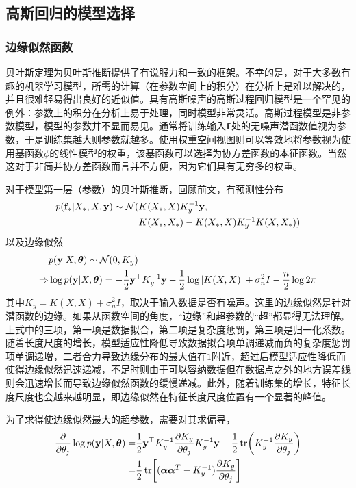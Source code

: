 \documentclass[12pt,UTF8]{article}
\begin{document}
        \subsection{高斯回归的模型选择}
            \subsubsection{边缘似然函数}
                贝叶斯定理为贝叶斯推断提供了有说服力和一致的框架。不幸的是，对于大多数有趣的机器学习模型，所需的计算（在参数空间上的积分）在分析上是难以解决的，并且很难轻易得出良好的近似值。具有高斯噪声的高斯过程回归模型是一个罕见的例外：参数上的积分在分析上易于处理，同时模型非常灵活。高斯过程模型是非参数模型，模型的参数并不显而易见。通常将训练输入$\vb{f}$处的无噪声潜函数值视为参数，于是训练集越大则参数就越多。使用权重空间视图则可以等效地将参数视为使用基函数$\phi$的线性模型的权重，该基函数可以选择为协方差函数的本征函数。当然这对于非简并协方差函数而言并不方便，因为它们具有无穷多的权重。\par
                对于模型第一层（参数）的贝叶斯推断，回顾前文，有预测性分布
                \begin{align}
                    p(\vb{f}_*|X_*,X,\vb{y})\sim\mathcal{N}(&K(X_*,X)K_y^{-1}\vb{y},\nonumber \\
                    &K(X_*,X_*)-K(X_*,X)K_y^{-1}K(X,X_*))
                \end{align}
                以及边缘似然
                \begin{align}
                    &p(\vb{y}|X,\vb*{\theta})\sim\mathcal{N}(0,K_y)\\
                    \Rightarrow&\log{p(\vb{y}|X,\vb*{\theta})}=-\frac{1}{2}\vb{y}^\top K_y^{-1}\vb{y}-\frac{1}{2}\log{\abs{K(X,X)}+\sigma_n^2I}-\frac{n}{2}\log{2\pi}
                \end{align}
                其中$K_y=K(X,X)+\sigma_n^2I$，取决于输入数据是否有噪声。这里的边缘似然是针对潜函数的边缘。如果从函数空间的角度，“边缘”和超参数的“超”都显得无法理解。上式中的三项，第一项是数据拟合，第二项是复杂度惩罚，第三项是归一化系数。随着长度尺度的增长，模型适应性降低导致数据拟合项单调递减而负的复杂度惩罚项单调递增，二者合力导致边缘分布的最大值在$1$附近，超过后模型适应性降低而使得边缘似然迅速递减，不足时则由于可以容纳数据但在数据点之外的地方误差线则会迅速增长而导致边缘似然函数的缓慢递减。此外，随着训练集的增长，特征长度尺度也会越来越明显，即边缘似然在特征长度尺度位置有一个显著的峰值。\par
                为了求得使边缘似然最大的超参数，需要对其求偏导，
                \begin{align}
                    \pdv{\theta_j} \log{p(\vb{y}|X,\vb*{\theta})}=&\frac{1}{2}\vb{y}^\top K_y^{-1}\pdv{K_y}{\theta_j}K_y^{-1}\vb{y}-\frac{1}{2}\tr(K_y^{-1}\pdv{K_y}{\theta_j}) \\
                    =&\frac{1}{2}\tr[(\vb*{\alpha}\vb*{\alpha}^T-K_y^{-1})\pdv{K_y}{\theta_j}]
                \end{align}
\end{document}
